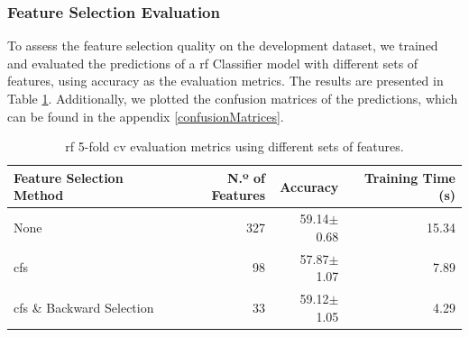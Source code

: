 \begin{table}[H]
	\caption{Final set of the 33 selected features.}
	\centering
	\label{tab:selectedFeat}
\end{table}



\subsubsection{Feature Selection Evaluation}

To assess the feature selection quality on the development dataset, we trained and evaluated the predictions of a \ac{rf} Classifier model with different sets of features, using accuracy as the evaluation metrics. The results are presented in Table \ref{tab:acc}. Additionally, we plotted the confusion matrices of the predictions, which can be found in the appendix \ref{confusionMatrices}.

\begin{table}[H]
	\caption{\ac{rf} 5-fold \ac{cv} evaluation metrics using different sets of features.}
	\centering
	\label{tab:acc}
	\begin{tabular}{lrrr}
		\toprule
		Feature Selection Method & N.º of Features & Accuracy & Training Time (s)\\
		\midrule
		None & 327 & 59.14$\pm$0.68 & 15.34 \\
		\ac{cfs} & 98 & 57.87$\pm$1.07 & 7.89 \\
		\ac{cfs} \& Backward Selection & 33 & 59.12$\pm$1.05 & 4.29\\
		\bottomrule
	\end{tabular}
\end{table}

